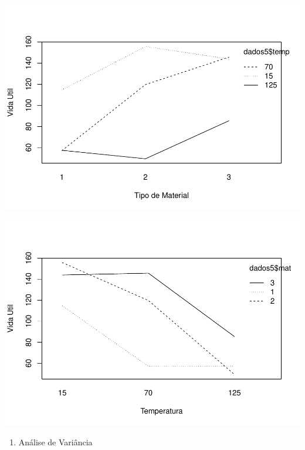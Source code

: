 \documentclass[
]{book}
\newenvironment{Shaded}{\begin{snugshade}}{\end{snugshade}}
\newcommand{\AttributeTok}[1]{\textcolor[rgb]{0.13,0.29,0.53}{#1}}
\newcommand{\CommentTok}[1]{\textcolor[rgb]{0.56,0.35,0.01}{\textit{#1}}}
\newcommand{\FunctionTok}[1]{\textcolor[rgb]{0.13,0.29,0.53}{\textbf{#1}}}
\newcommand{\NormalTok}[1]{#1}
\newcommand{\SpecialCharTok}[1]{\textcolor[rgb]{0.81,0.36,0.00}{\textbf{#1}}}
\newcommand{\StringTok}[1]{\textcolor[rgb]{0.31,0.60,0.02}{#1}}
\providecommand{\tightlist}{%
  \setlength{\itemsep}{0pt}\setlength{\parskip}{0pt}}
\begin{document}
\includegraphics{_main_files/figure-latex/unnamed-chunk-11-1.pdf}

\begin{Shaded}
\end{Shaded}

\includegraphics{_main_files/figure-latex/unnamed-chunk-11-2.pdf}

\begin{enumerate}
\def\labelenumi{\arabic{enumi}.}
\setcounter{enumi}{2}
\tightlist
\item
  Análise de Variância
\end{enumerate}
\end{document}
